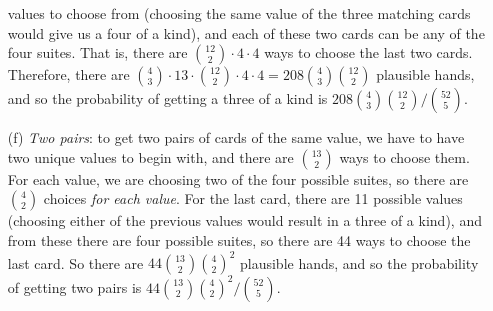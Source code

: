 \documentclass[10pt]{article}
\begin{document}
\begin{itemize}
    values to choose from (choosing the same value of the three matching cards would give us a four of a kind), and each of these two cards can be 
    any of the four suites. That is, there are \(\binom{12}{2}\cdot4\cdot4\) ways to choose the last two cards. Therefore, there are 
    \(\binom{4}{3}\cdot13\cdot\binom{12}{2}\cdot4\cdot4 = 208\binom{4}{3}\binom{12}{2}\) plausible hands, and so the probability of 
    getting a three of a kind is \(208\binom{4}{3}\binom{12}{2} / \binom{52}{5}\).
    \item[(f)] \textsl{Two pairs}: to get two pairs of cards of the same value, we have to have two unique values to begin with, and there are 
    \(\binom{13}{2}\) ways to choose them. For each value, we are choosing two of the four possible suites, so there are \(\binom{4}{2}\) choices 
    \textit{for each value}. For the last card, there are 11 possible values (choosing either of the previous values would result in a three of a kind),
    and from these there are four possible suites, so there are 44 ways to choose the last card. So there are \(44\binom{13}{2}\binom{4}{2}^2\) plausible 
    hands, and so the probability of getting two pairs is \(44\binom{13}{2}\binom{4}{2}^2 / \binom{52}{5}\).
\end{itemize}
\end{document}
